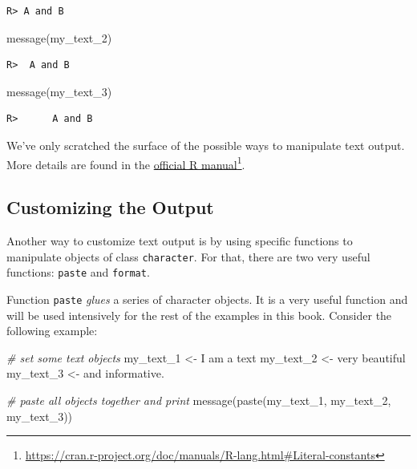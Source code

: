 \documentclass[
  12pt,
]{book}
\newenvironment{Shaded}{\begin{snugshade}}{\end{snugshade}}
\newcommand{\CommentTok}[1]{\textcolor[rgb]{0.37,0.37,0.37}{\textit{#1}}}
\newcommand{\FunctionTok}[1]{\textcolor[rgb]{0,0,0}{#1}}
\newcommand{\NormalTok}[1]{#1}
\newcommand{\OtherTok}[1]{\textcolor[rgb]{0.37,0.37,0.37}{#1}}
\newcommand{\StringTok}[1]{\textcolor[rgb]{0.5,0.5,0.5}{#1}}
\begin{document}
\begin{verbatim}
R> A and B
\end{verbatim}

\begin{Shaded}
\begin{Highlighting}[]
\FunctionTok{message}\NormalTok{(my\_text\_2)}
\end{Highlighting}
\end{Shaded}

\begin{verbatim}
R>  A and B
\end{verbatim}

\begin{Shaded}
\begin{Highlighting}[]
\FunctionTok{message}\NormalTok{(my\_text\_3)}
\end{Highlighting}
\end{Shaded}

\begin{verbatim}
R>      A and B
\end{verbatim}

We've only scratched the surface of the possible ways to manipulate text output. More details are found in the \href{https://cran.r-project.org/doc/manuals/R-lang.html\#Literal-constants}{official R manual}\footnote{\url{https://cran.r-project.org/doc/manuals/R-lang.html\#Literal-constants}}.

\hypertarget{customizing-the-output}{%
\subsection{Customizing the Output}\label{customizing-the-output}}

Another way to customize text output is by using specific functions to manipulate objects of class \texttt{character}. For that, there are two very useful functions: \texttt{paste} and \texttt{format}.  

Function \texttt{paste} \emph{glues} a series of character objects. It is a very useful function and will be used intensively for the rest of the examples in this book. Consider the following example:

\begin{Shaded}
\begin{Highlighting}[]
\CommentTok{\# set some text objects}
\NormalTok{my\_text\_1 }\OtherTok{\textless{}{-}} \StringTok{\textquotesingle{}I am a text\textquotesingle{}}
\NormalTok{my\_text\_2 }\OtherTok{\textless{}{-}} \StringTok{\textquotesingle{}very beautiful\textquotesingle{}}
\NormalTok{my\_text\_3 }\OtherTok{\textless{}{-}} \StringTok{\textquotesingle{}and informative.\textquotesingle{}}

\CommentTok{\# paste all objects together and print}
\FunctionTok{message}\NormalTok{(}\FunctionTok{paste}\NormalTok{(my\_text\_1, my\_text\_2, my\_text\_3))}
\end{Highlighting}
\end{Shaded}
\end{document}
